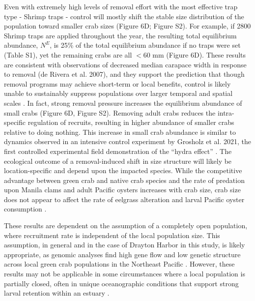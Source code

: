 \documentclass{article}
\begin{document}
Even with extremely high levels of removal effort with the most effective trap type - Shrimp traps - control will mostly shift the stable size distribution of the population toward smaller crab sizes (Figure 6D; Figure S2). For example, if 2800 Shrimp traps are applied throughout the year, the resulting total equilibrium abundance, $N^E$, is 25\% of the total equilibrium abundance if no traps were set (Table S1), yet the remaining crabs are all $<$60 mm (Figure 6D). These results are consistent with observations of decreased median carapace width in response to removal (de Rivera et al. 2007), and they support the prediction that though removal programs may achieve short-term or local benefits, control is likely unable to sustainably suppress populations over larger temporal and spatial scales \parencite{keller2025transition, tummon2024rebound, kanary2014modelling}. In fact, strong removal pressure increases the equilibrium abundance of small crabs (Figure 6D, Figure S2). Removing adult crabs reduces the intra-specific regulation of recruits, resulting in higher abundance of smaller crabs relative to doing nothing. This increase in small crab abundance is similar to dynamics observed in an intensive control experiment by Grosholz et al. 2021, the first controlled experimental field demonstration of the “hydra effect” \parencite{grosholz2021stage}. The ecological outcome of a removal-induced shift in size structure will likely be location-specific and depend upon the impacted species. While the competitive advantage between green crab and native crab species and the rate of predation upon Manila clams and adult Pacific oysters increases with crab size, crab size does not appear to affect the rate of eelgrass alteration and larval Pacific oyster consumption \parencite{anaya2025effect, mcdonald2001competitive}. 

These results are dependent on the assumption of a completely open population, where recruitment rate is independent of the local population size. This assumption, in general and in the case of Drayton Harbor in this study, is likely appropriate, as genomic analyses find high gene flow and low genetic structure across local green crab populations in the Northeast Pacific \parencite{tepolt2009european, tepolt2022balanced}. However, these results may not be applicable in some circumstances where a local population is partially closed, often in unique oceanographic conditions that support strong larval retention within an estuary \parencite{grosholz2021stage}. 
\end{document}
